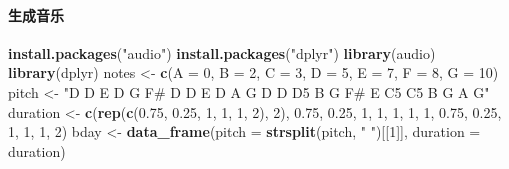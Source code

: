 \documentclass[
]{book}
\newenvironment{Shaded}{\begin{snugshade}}{\end{snugshade}}
\newcommand{\AttributeTok}[1]{\textcolor[rgb]{0.13,0.29,0.53}{#1}}
\newcommand{\DecValTok}[1]{\textcolor[rgb]{0.00,0.00,0.81}{#1}}
\newcommand{\FloatTok}[1]{\textcolor[rgb]{0.00,0.00,0.81}{#1}}
\newcommand{\FunctionTok}[1]{\textcolor[rgb]{0.13,0.29,0.53}{\textbf{#1}}}
\newcommand{\NormalTok}[1]{#1}
\newcommand{\OtherTok}[1]{\textcolor[rgb]{0.56,0.35,0.01}{#1}}
\newcommand{\StringTok}[1]{\textcolor[rgb]{0.31,0.60,0.02}{#1}}
\begin{document}
\hypertarget{ux751fux6210ux97f3ux4e50}{%
\paragraph{生成音乐}\label{ux751fux6210ux97f3ux4e50}}

\begin{Shaded}
\begin{Highlighting}[]
\FunctionTok{install.packages}\NormalTok{(}\StringTok{"audio"}\NormalTok{)}
\FunctionTok{install.packages}\NormalTok{(}\StringTok{"dplyr"}\NormalTok{)}
\FunctionTok{library}\NormalTok{(audio)}
\FunctionTok{library}\NormalTok{(dplyr)}
\NormalTok{notes }\OtherTok{\textless{}{-}} \FunctionTok{c}\NormalTok{(}\AttributeTok{A =} \DecValTok{0}\NormalTok{, }\AttributeTok{B =} \DecValTok{2}\NormalTok{, }\AttributeTok{C =} \DecValTok{3}\NormalTok{, }\AttributeTok{D =} \DecValTok{5}\NormalTok{, }\AttributeTok{E =} \DecValTok{7}\NormalTok{, }\AttributeTok{F =} \DecValTok{8}\NormalTok{, }\AttributeTok{G =} \DecValTok{10}\NormalTok{)}
\NormalTok{pitch }\OtherTok{\textless{}{-}} \StringTok{"D D E D G F\# D D E D A G D D D5 B G F\# E C5 C5 B G A G"}
\NormalTok{duration }\OtherTok{\textless{}{-}} \FunctionTok{c}\NormalTok{(}\FunctionTok{rep}\NormalTok{(}\FunctionTok{c}\NormalTok{(}\FloatTok{0.75}\NormalTok{, }\FloatTok{0.25}\NormalTok{, }\DecValTok{1}\NormalTok{, }\DecValTok{1}\NormalTok{, }\DecValTok{1}\NormalTok{, }\DecValTok{2}\NormalTok{), }\DecValTok{2}\NormalTok{),}
              \FloatTok{0.75}\NormalTok{, }\FloatTok{0.25}\NormalTok{, }\DecValTok{1}\NormalTok{, }\DecValTok{1}\NormalTok{, }\DecValTok{1}\NormalTok{, }\DecValTok{1}\NormalTok{, }\DecValTok{1}\NormalTok{, }\FloatTok{0.75}\NormalTok{, }\FloatTok{0.25}\NormalTok{, }\DecValTok{1}\NormalTok{, }\DecValTok{1}\NormalTok{, }\DecValTok{1}\NormalTok{, }\DecValTok{2}\NormalTok{)}
\NormalTok{bday }\OtherTok{\textless{}{-}} \FunctionTok{data\_frame}\NormalTok{(}\AttributeTok{pitch =} \FunctionTok{strsplit}\NormalTok{(pitch, }\StringTok{" "}\NormalTok{)[[}\DecValTok{1}\NormalTok{]],}
                   \AttributeTok{duration =}\NormalTok{ duration)}


\end{Highlighting}
\end{Shaded}
\end{document}
